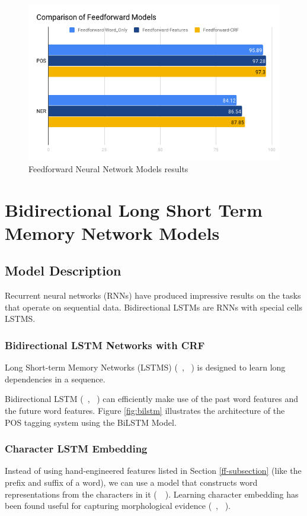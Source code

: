\documentclass{sfuthesis}
\begin{document}
\begin{figure}
  \centering
  \includegraphics[scale=0.6]{ff.png}
 \caption{Feedforward Neural Network Models results}
  \label{fig:ff}
\end{figure}



\chapter{Bidirectional Long Short Term Memory Network Models}
\section{Model Description}

Recurrent neural networks (RNNs) have produced impressive results on the tasks that operate on sequential data. Bidirectional LSTMs are RNNs with special cells LSTMS.

\subsection{Bidirectional LSTM Networks with CRF}

Long Short-term Memory Networks (LSTMS) (~\citeauthor{hochreiter1997long}, ~\citeyear{hochreiter1997long}) is designed to learn long dependencies in a sequence. 

Bidirectional LSTM (~\citeauthor{graves2013hybrid}, ~\citeyear{graves2013hybrid}) can efficiently make use of the past word features and the future word features. Figure \ref{fig:bilstm} illustrates the architecture of the POS tagging system using the BiLSTM Model.

\subsection{Character LSTM Embedding}
Instead of using hand-engineered features listed in Section \ref{ff-subsection} (like the prefix and suffix of a word), we can use a model that constructs word representations from the characters in it (~\citeauthor{lample2016neural}~\citeyear{lample2016neural}). Learning character embedding has been found useful for capturing morphological evidence (~\citeauthor{ling2015finding}, ~\citeyear{ling2015finding}).
\end{document}
